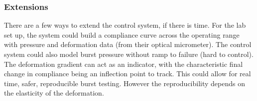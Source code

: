 \documentclass[10pt, a4paper]{article}
\begin{document}
\subsubsection{Extensions}
There are a few ways to extend the control system, if there is time. For the lab set up, the system could build a compliance curve across the operating range with pressure and deformation data (from their optical micrometer). The control system could also model burst pressure without ramp to failure (hard to control). The deformation gradient can act as an indicator, with the characteristic final change in compliance being an inflection point to track. This could allow for real time, safer, reproducible burst testing. However the reproducibility depends on the elasticity of the deformation.
\end{document}

